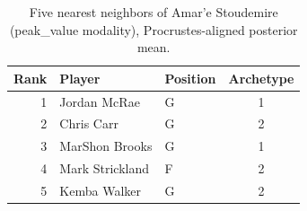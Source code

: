 \begin{table}[htbp]
  \centering\small
  \begin{tabular}{rllc}
    \toprule
    Rank & Player & Position & Archetype \\
    \midrule
    1 & Jordan McRae & G & 1 \\
    2 & Chris Carr & G & 2 \\
    3 & MarShon Brooks & G & 1 \\
    4 & Mark Strickland & F & 2 \\
    5 & Kemba Walker & G & 2 \\
    \bottomrule
  \end{tabular}
  \caption{Five nearest neighbors of Amar'e Stoudemire (peak_value modality), Procrustes-aligned posterior mean.}
  \label{tab:Amar_e_Stoudemire_neighbors_peak_value}
\end{table}

